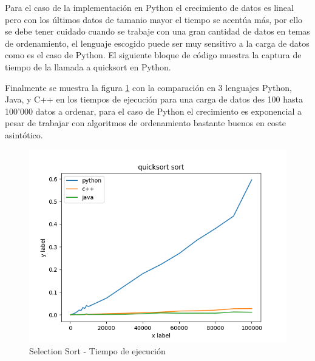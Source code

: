 \documentclass{article}
\begin{document}
\begin{enumerate}
                            
                            
                            Para el caso de la implementaci\'{o}n en Python el crecimiento de datos es lineal pero con los últimos datos de tamanio mayor el tiempo se acentúa más, por ello se debe tener cuidado cuando se trabaje con una gran cantidad de datos en temas de ordenamiento, el lenguaje escogido puede ser muy sensitivo a la carga de datos como es el caso de Python. El siguiente bloque de código muestra la captura de tiempo de la llamada a quicksort en Python.
                            
                            
                            
                            Finalmente se muestra la figura \ref{fig:quicksort_diagram} con la comparación en 3 lenguajes {Python, Java, y C++} en los tiempos de ejecución para una carga de datos des 100 hasta 100'000 datos a ordenar, para el caso de Python el crecimiento es exponencial a pesar de trabajar con algoritmos de ordenamiento bastante buenos en coste asintótico.
                            
                            \begin{figure}[H]
                                \centering
                                \includegraphics[scale=0.60]{img/quicksort_diagram.png}
                                \caption{Selection Sort - Tiempo de ejecución}
                                \label{fig:quicksort_diagram}
                            \end{figure}
		                

\end{enumerate}
\end{document}
